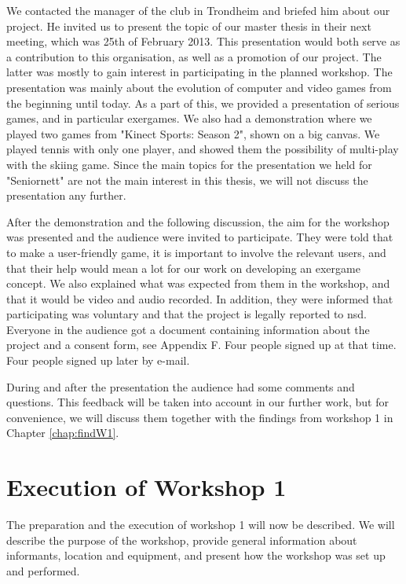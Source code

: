 We contacted the manager of the club in Trondheim and briefed him about our project. He invited us to present the topic of our master thesis in their next meeting, which was 25th of February 2013. This presentation would both serve as a contribution to this organisation, as well as a promotion of our project. The latter was mostly to gain interest in participating in the planned workshop. The presentation was mainly about the evolution of computer and video games from the beginning until today. As a part of this, we provided a presentation of serious games, and in particular exergames. We also had a demonstration where we played two games from "Kinect Sports: Season 2", shown on a big canvas. We played tennis with only one player, and showed them the possibility of multi-play with the skiing game. Since the main topics for the presentation we held for "Seniornett" are not the main interest in this thesis, we will not discuss the presentation any further.

After the demonstration and the following discussion, the aim for the workshop was presented and the audience were invited to participate. They were told that to make a user-friendly game, it is important to involve the relevant users, and that their help would mean a lot for our work on developing an exergame concept. We also explained what was expected from them in the workshop, and that it would be video and audio recorded. In addition, they were informed that participating was voluntary and that the project is legally reported to \ac{nsd}. Everyone in the audience got a document containing information about the project and a consent form, see Appendix F. Four people signed up at that time. Four people signed up later by e-mail.

During and after the presentation the audience had some comments and questions. This feedback will be taken into account in our further work, but for convenience, we will discuss them together with the findings from workshop 1 in Chapter \ref{chap:findW1}. 

\section{Execution of Workshop 1}
\label{sec:ws1}

The preparation and the execution of workshop 1 will now be described. We will describe the purpose of the workshop, provide general information about informants, location and equipment, and present how the workshop was set up and performed. 

